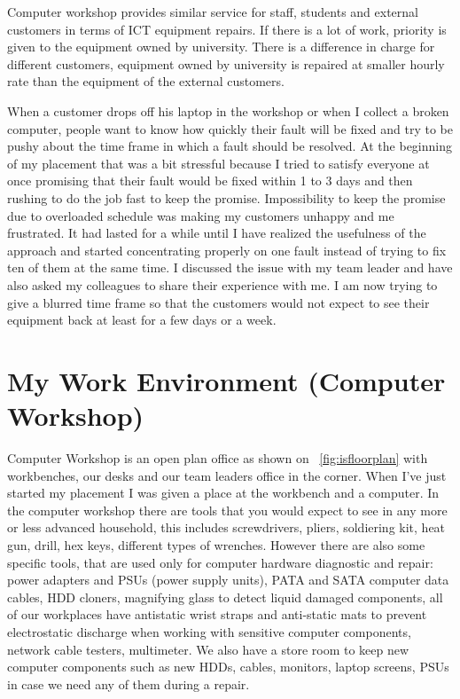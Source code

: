 \documentclass[10pt,a4paper,headinclude=true]{report}
\begin{document}
Computer workshop provides similar service for staff, students and external customers in terms of ICT equipment repairs. If there is a lot of work, priority is given to the equipment owned by university. There is a difference in charge for different customers, equipment owned by university is repaired at smaller hourly rate than the equipment of the external customers.

When a customer drops off his laptop in the workshop or when I collect a broken computer, people want to know how quickly their fault will be fixed and try to be pushy about the time frame in which a fault should be resolved. At the beginning of my placement that was a bit stressful because I tried to satisfy everyone at once promising that their fault would be fixed within 1 to 3 days and then rushing to do the job fast to keep the promise. Impossibility to keep the promise due to overloaded schedule was making my customers unhappy and me frustrated. It had lasted for a while until I have realized the usefulness of the approach and started concentrating properly on one fault instead of trying to fix ten of them at the same time. I discussed the issue with my team leader and have also asked my colleagues to share their experience with me. I am now trying to give a blurred time frame so that the customers would not expect to see their equipment back at least for a few days or a week.  
\section{My Work Environment (Computer Workshop)}
Computer Workshop is an open plan office as shown on ~\ref{fig:isfloorplan} with workbenches, our desks and our team leaders office in the corner. When I've just started my placement I was given a place at the workbench and a computer. In the computer workshop there are tools that you would expect to see in any more or less advanced household, this includes screwdrivers, pliers, soldiering kit, heat gun, drill, hex keys, different types of wrenches. However there are also some specific tools, that are used only for computer hardware diagnostic and repair: power adapters and PSUs (power supply units), PATA and SATA computer data cables, HDD cloners, magnifying glass to detect liquid damaged components, all of our workplaces have antistatic wrist straps and anti-static mats to prevent electrostatic discharge when working with sensitive computer components, network cable testers, multimeter. We also have a store room to keep new computer components such as new HDDs, cables, monitors, laptop screens, PSUs in case we need any of them during a repair.    
\end{document}
